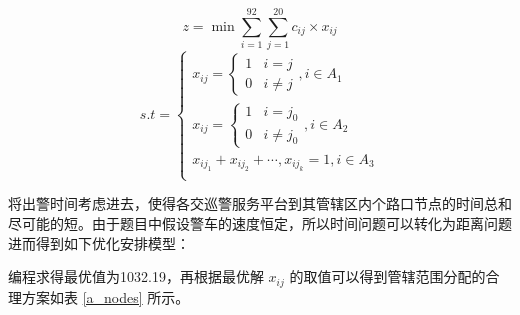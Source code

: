 \documentclass{cumcmthesis}
\begin{document}
      \begin{equation}
        z = \min{\sum_{i=1}^{92}\sum_{j=1}^{20} c_{ij} \times x_{ij}}
      \end{equation}
      \begin{equation}
        s.t =
        \begin{cases}
          x_{ij} =
          \begin{cases}
            1 & i = j   \\
            0 & i \ne j
          \end{cases} , i \in A_1                 \\
          x_{ij} =
          \begin{cases}
            1 & i = j_0   \\
            0 & i \ne j_0
          \end{cases} , i \in A_2                 \\
          x_{ij_1} + x_{ij_2} + \cdots, x_{ij_k} = 1 , i \in A_3 \\
        \end{cases}
      \end{equation}

      将出警时间考虑进去，使得各交巡警服务平台到其管辖区内个路口节点的时间总和尽可能的短。由于题目中假设警车的速度恒定，所以时间问题可以转化为距离问题进而得到如下优化安排模型：

      编程求得最优值为1032.19，再根据最优解 $x_{ij}$ 的取值可以得到管辖范围分配的合理方案如表 \ref{a_nodes} 所示。
\end{document}
